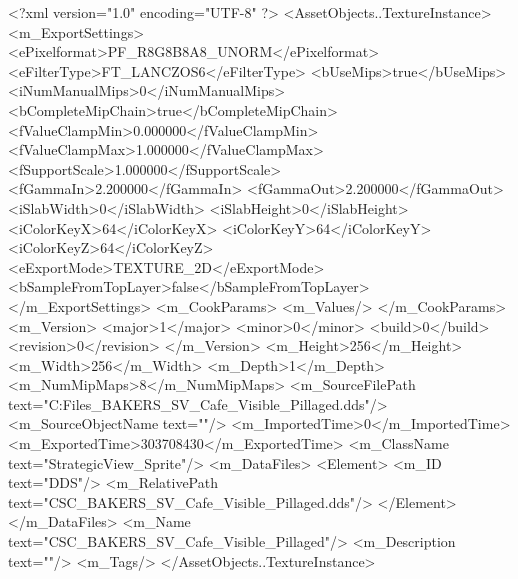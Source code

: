 <?xml version="1.0" encoding="UTF-8" ?>
<AssetObjects..TextureInstance>
	<m_ExportSettings>
		<ePixelformat>PF_R8G8B8A8_UNORM</ePixelformat>
		<eFilterType>FT_LANCZOS6</eFilterType>
		<bUseMips>true</bUseMips>
		<iNumManualMips>0</iNumManualMips>
		<bCompleteMipChain>true</bCompleteMipChain>
		<fValueClampMin>0.000000</fValueClampMin>
		<fValueClampMax>1.000000</fValueClampMax>
		<fSupportScale>1.000000</fSupportScale>
		<fGammaIn>2.200000</fGammaIn>
		<fGammaOut>2.200000</fGammaOut>
		<iSlabWidth>0</iSlabWidth>
		<iSlabHeight>0</iSlabHeight>
		<iColorKeyX>64</iColorKeyX>
		<iColorKeyY>64</iColorKeyY>
		<iColorKeyZ>64</iColorKeyZ>
		<eExportMode>TEXTURE_2D</eExportMode>
		<bSampleFromTopLayer>false</bSampleFromTopLayer>
	</m_ExportSettings>
	<m_CookParams>
		<m_Values/>
	</m_CookParams>
	<m_Version>
		<major>1</major>
		<minor>0</minor>
		<build>0</build>
		<revision>0</revision>
	</m_Version>
	<m_Height>256</m_Height>
	<m_Width>256</m_Width>
	<m_Depth>1</m_Depth>
	<m_NumMipMaps>8</m_NumMipMaps>
	<m_SourceFilePath text="C:\Users\Shadow\Desktop\Working Files\Icons\StrategicView\CSC_BAKERS_SV_Cafe_Visible_Pillaged.dds"/>
	<m_SourceObjectName text=""/>
	<m_ImportedTime>0</m_ImportedTime>
	<m_ExportedTime>303708430</m_ExportedTime>
	<m_ClassName text="StrategicView_Sprite"/>
	<m_DataFiles>
		<Element>
			<m_ID text="DDS"/>
			<m_RelativePath text="CSC_BAKERS_SV_Cafe_Visible_Pillaged.dds"/>
		</Element>
	</m_DataFiles>
	<m_Name text="CSC_BAKERS_SV_Cafe_Visible_Pillaged"/>
	<m_Description text=""/>
	<m_Tags/>
</AssetObjects..TextureInstance>

